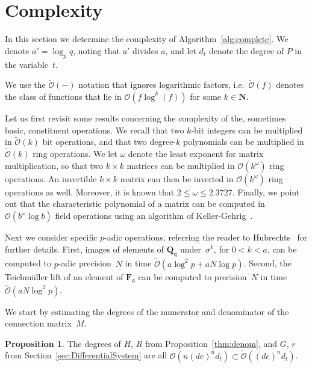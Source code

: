 \documentclass[a4paper,11pt]{article}
\numberwithin{equation}{section}
\newcommand{\NN}{\mathbf{N}} %
\newcommand{\QQ}{\mathbf{Q}} %
\newcommand{\FF}{\mathbf{F}} %
\providecommand{\BigOh}{\mathcal{O}}          %
\providecommand{\SoftOh}{\tilde{\mathcal{O}}} %
\theoremstyle{definition}
\newtheorem{prop}[thm]{Proposition}
\begin{document}
\section{Complexity}

\label{sec:Complexity}

In this section we determine the complexity of Algorithm~\ref{alg:complete}.
We denote $a' = \log_p q$, noting that $a'$ divides $a$, 
and let $d_t$ denote the degree of $P$ in the variable~$t$. 

We use the $\SoftOh(-)$ notation that ignores logarithmic factors, 
i.e.\ $\SoftOh(f)$ denotes the class of functions 
that lie in $\BigOh(f \log^k(f))$ for some $k \in \NN$.

Let us first revisit some results concerning the complexity of the, 
sometimes basic, constituent operations.  We recall that two $k$-bit 
integers can be multiplied in $\SoftOh(k)$ bit operations, and that 
two degree-$k$ polynomials can be multiplied in $\SoftOh(k)$ ring 
operations.  We let $\omega$ denote the least exponent for matrix 
multiplication, so that two $k \times k$ matrices can be multiplied 
in $\BigOh(k^{\omega})$ ring operations. An invertible $k \times k$ matrix 
can then be inverted in $\BigOh(k^{\omega})$ ring operations as well. 
Moreover, it is known that $2 \leq \omega \leq 2.3727$.  Finally, we 
point out that the characteristic polynomial of a matrix can be 
computed in $\BigOh(b^{\omega} \log b)$ field operations using 
an algorithm of Keller-Gehrig~\citep{KellerGehrig1985}.

Next we consider specific $p$-adic operations, referring the reader to 
Hubrechts~\citep{Hubrechts2010} for further details.  First, images of elements 
of $\QQ_{\mathfrak{q}}$ under~$\sigma^k$, for $0 < k < a$, can be computed to 
$p$-adic precision~$N$ in time $\SoftOh(a \log^2 p + a N \log p)$.  Second, 
the Teichm\"uller lift of an element of $\FF_{\mathfrak{q}}$ can be computed 
to precision~$N$ in time $\SoftOh(a N \log^2 p)$.

We start by estimating the degrees of the numerator and denominator of the
connection matrix~$M$.

\begin{prop}
The degrees of $H$, $R$ from Proposition~\ref{thm:denom}, and
$G$, $r$ from Section~\ref{sec:DifferentialSystem} are all
$\BigOh(n(de)^n d_t) \subset \SoftOh((de)^n d_t)$.
\end{prop}
\end{document}
